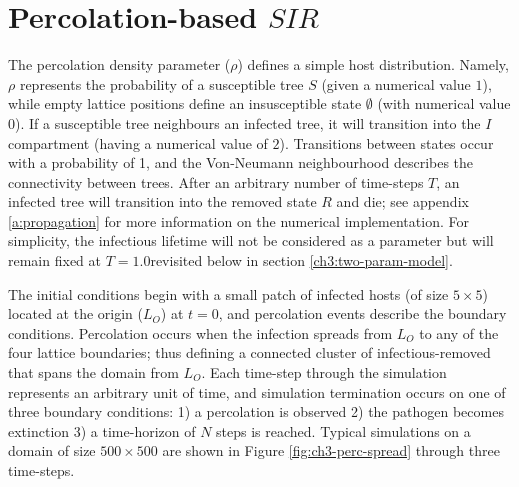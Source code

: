 \section{Percolation-based $SIR$}

The percolation density parameter ($\rho$) defines a simple host distribution.
Namely, $\rho$ represents the probability of a susceptible tree $S$ (given a numerical value $1$), 
while empty lattice positions define an insusceptible state $\emptyset$ (with numerical value $0$).
If a susceptible tree neighbours an infected tree, it will transition into the $I$ compartment (having a numerical value of $2$).
Transitions between states occur with a probability of 1, and the Von-Neumann neighbourhood describes the connectivity between trees.
After an arbitrary number of time-steps $T$, an infected tree will transition into the removed state $R$ and die; 
see appendix \ref{a:propagation} for more information on the numerical implementation. %
For simplicity, the infectious lifetime will not be considered as a parameter but will remain fixed at $T=1.0$\textemdash revisited below in section \ref{ch3:two-param-model}.

The initial conditions begin with a small patch of infected hosts (of size $5\times5$) located at the origin ($L_O$) at $t=0$, and percolation events describe the boundary conditions. 
Percolation occurs when the infection spreads from $L_O$ to any of the four lattice boundaries;  thus defining a connected cluster of infectious-removed that spans the domain from $L_O$.
Each time-step through the simulation represents an arbitrary unit of time, and simulation termination occurs on one of three boundary conditions: 
1) a percolation is observed 
2) the pathogen becomes extinction 
3) a time-horizon of $N$ steps is reached. 
Typical simulations on a domain of size $500 \times 500$ are shown in Figure \ref{fig:ch3-perc-spread} through three time-steps. 

